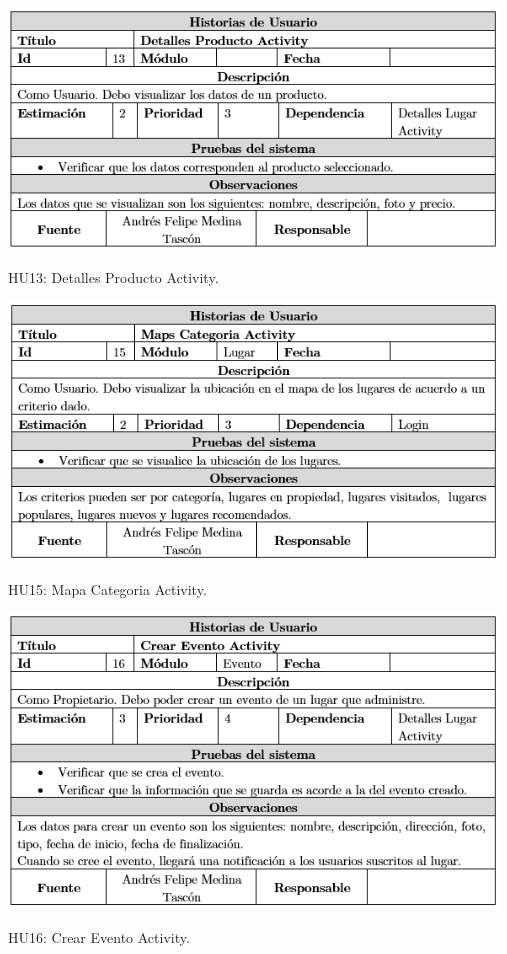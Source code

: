 \documentclass[12pt,letterpaper,openany]{book}
\begin{document}
\begin{table}[H]
\centering
\includegraphics[width=13cm]{./imagenes/HU/HU13}
\caption{HU13: Detalles Producto Activity.}
\end{table}

\begin{table}[H]
\centering
\includegraphics[width=13cm]{./imagenes/HU/HU15}
\caption{HU15: Mapa Categoria Activity.}
\end{table}

\begin{table}[H]
\centering
\includegraphics[width=13cm]{./imagenes/HU/HU16}
\caption{HU16: Crear Evento Activity.}
\end{table}
\end{document}

